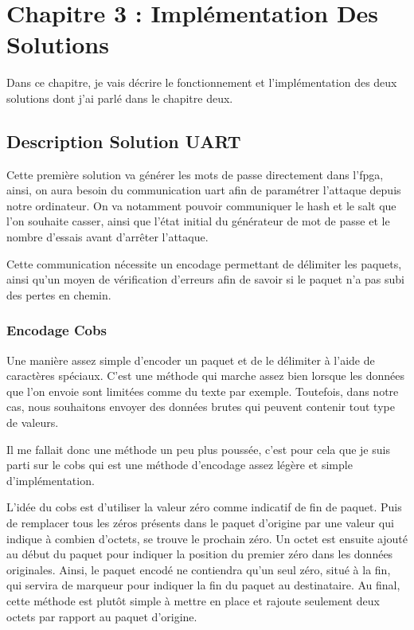 \chapter{Chapitre 3 : Implémentation Des Solutions}

Dans ce chapitre, je vais décrire le fonctionnement et l'implémentation des deux solutions dont j'ai parlé dans le chapitre deux.

\section{Description Solution UART}

Cette première solution va générer les mots de passe directement dans l’\gls{fpga}, ainsi, on aura besoin du communication \gls{uart} afin de paramétrer l’attaque depuis notre ordinateur. 
On va notamment pouvoir communiquer le hash et le salt que l’on souhaite casser, ainsi que l’état initial du générateur de mot de passe et le nombre d’essais avant d’arrêter l'attaque.

Cette communication nécessite un encodage permettant de délimiter les paquets, ainsi qu'un moyen de vérification d'erreurs afin de savoir si le paquet n'a pas subi des pertes en chemin.

\subsection{Encodage Cobs}

Une manière assez simple d’encoder un paquet et de le délimiter à l’aide de caractères spéciaux. 
C’est une méthode qui marche assez bien lorsque les données que l’on envoie sont limitées comme du texte par exemple. 
Toutefois, dans notre cas, nous souhaitons envoyer des données brutes qui peuvent contenir tout type de valeurs.

Il me fallait donc une méthode un peu plus poussée, c’est pour cela que je suis parti sur le \gls{cobs} qui est une méthode d’encodage assez légère et simple d’implémentation.

L’idée du \gls{cobs} est d’utiliser la valeur zéro comme indicatif de fin de paquet. 
Puis de remplacer tous les zéros présents dans le paquet d’origine par une valeur qui indique à combien d’octets, se trouve le prochain zéro. 
Un octet est ensuite ajouté au début du paquet pour indiquer la position du premier zéro dans les données originales. 
Ainsi, le paquet encodé ne contiendra qu’un seul zéro, situé à la fin, qui servira de marqueur pour indiquer la fin du paquet au destinataire. 
Au final, cette méthode est plutôt simple à mettre en place et rajoute seulement deux octets par rapport au paquet d’origine.

